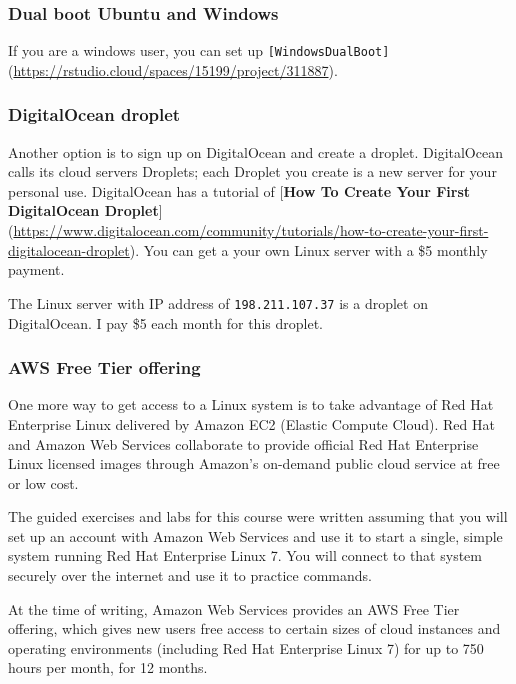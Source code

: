\documentclass[]{book}
\begin{document}
\hypertarget{dual-boot-ubuntu-and-windows}{%
\subsubsection{Dual boot Ubuntu and Windows}\label{dual-boot-ubuntu-and-windows}}

If you are a windows user, you can set up \texttt{{[}WindowsDualBoot{]}}(\url{https://rstudio.cloud/spaces/15199/project/311887}).

\hypertarget{digitalocean-droplet}{%
\subsubsection{DigitalOcean droplet}\label{digitalocean-droplet}}

Another option is to sign up on DigitalOcean and create a droplet. DigitalOcean calls its cloud servers Droplets; each Droplet you create is a new server for your personal use. DigitalOcean has a tutorial of {[}\textbf{How To Create Your First DigitalOcean Droplet}{]} (\url{https://www.digitalocean.com/community/tutorials/how-to-create-your-first-digitalocean-droplet}). You can get a your own Linux server with a \$5 monthly payment.

The Linux server with IP address of \texttt{198.211.107.37} is a droplet on DigitalOcean. I pay \$5 each month for this droplet.

\hypertarget{aws-free-tier-offering}{%
\subsubsection{AWS Free Tier offering}\label{aws-free-tier-offering}}

One more way to get access to a Linux system is to take advantage of Red Hat Enterprise Linux delivered by Amazon EC2 (Elastic Compute Cloud). Red Hat and Amazon Web Services collaborate to provide official Red Hat Enterprise Linux licensed images through Amazon's on-demand public cloud service at free or low cost.

The guided exercises and labs for this course were written assuming that you will set up an account with Amazon Web Services and use it to start a single, simple system running Red Hat Enterprise Linux 7. You will connect to that system securely over the internet and use it to practice commands.

At the time of writing, Amazon Web Services provides an AWS Free Tier offering, which gives new users free access to certain sizes of cloud instances and operating environments (including Red Hat Enterprise Linux 7) for up to 750 hours per month, for 12 months.
\end{document}
